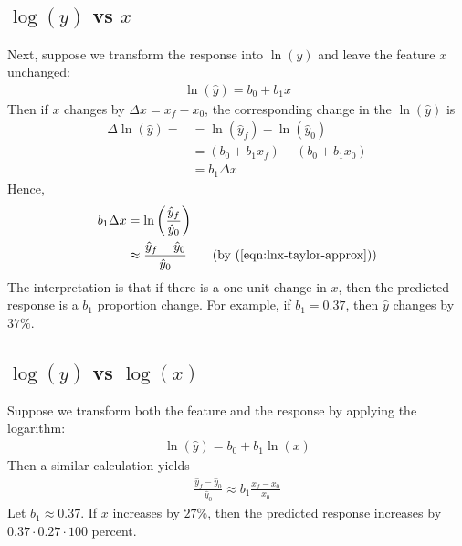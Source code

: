 \documentclass[12pt, a4paper]{article}
\theoremstyle{definition}
\begin{document}
	\subsection*{$\log(\hat{y})$ vs $x$}
	Next, suppose we transform the response into $\ln(y)$ and leave the feature $x$
	unchanged:
	\begin{align*}
		\ln(\hat{y}) = b_0 + b_1x
	\end{align*}
	Then if $x$ changes by $\Delta x = x_f-x_0$, the corresponding change in the $\ln(\hat{y})$
	is
	\begin{align*}
		\Delta \ln(\hat{y})=
		&=\ln(\hat{y}_f) - \ln(\hat{y}_0)\\
		&= (b_0 + b_1x_f) - (b_0 + b_1x_0)\\
		&=b_1\Delta x
	\end{align*}
	Hence,
	\begin{align*}
	b_1\Delta x
	&= \ln\left(\frac{\hat{y}_f}{\hat{y}_0}\right)\\
	&\approx \frac{\hat{y}_f - \hat{y}_0}{\hat{y}_0}
	\tag{by (\ref{eqn:lnx-taylor-approx})}
	\end{align*}
	The interpretation is that if there is a one unit change in $x$, then the predicted
	response is a $b_1$ proportion change. For example, if $b_1=0.37$, then
	$\hat{y}$ changes by $37\%$.
	\subsection*{$\log(\hat{y})$ vs $\log(x)$}
	Suppose we transform both the feature and the response by applying the logarithm:
	\begin{align*}
		\ln(\hat{y}) = b_0 + b_1\ln(x)
	\end{align*}
	Then a similar calculation yields
	\begin{align*}
		\frac{\hat{y}_f - \hat{y}_0}{\hat{y}_0} \approx b_1 \frac{x_f - x_0}{x_0}
	\end{align*}
	Let $b_1 \approx 0.37$. If $x$ increases by $27\%$, then the predicted response
	increases by $0.37\cdot 0.27\cdot 100$ percent.
\end{document}
